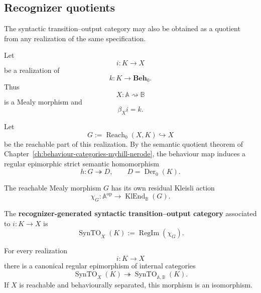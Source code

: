 \subsection{Recognizer quotients}
\label{subsec:syn-to-recognizer-quotients}

The syntactic transition--output category may also be obtained as a quotient
from any realization of the same specification.

Let
\[
    i:K\to X
\]
be a realization of
\[
    k:K\to\mathbf{Beh}_0.
\]
Thus
\[
    X:\mathbb A\rightsquigarrow\mathbb B
\]
is a Mealy morphism and
\[
    \beta_X i=k.
\]

Let
\[
    G:=\operatorname{Reach}_0(X,K)\hookrightarrow X
\]
be the reachable part of this realization. By the semantic quotient theorem of
Chapter~\ref{ch:behaviour-categories-myhill-nerode}, the behaviour map induces
a regular epimorphic strict semantic homomorphism
\[
    h:G\twoheadrightarrow D,
    \qquad
    D=\operatorname{Der}_0(K).
\]

The reachable Mealy morphism \(G\) has its own residual Kleisli action
\[
    \chi_G:
    \mathbb A^{\mathrm{op}}
    \to
    \operatorname{KlEnd}_{\mathbb B}(G).
\]

\begin{definition}
\label{def:syn-to-recognizer-generated-syntactic-category}
    The \textbf{recognizer-generated syntactic transition--output category}
    associated to \(i:K\to X\) is
    \[
        \operatorname{SynTO}_X(K)
        :=
        \operatorname{RegIm}(\chi_G).
    \]
\end{definition}

\begin{theorem}
\label{thm:syn-to-recognizer-quotient}
    For every realization
    \[
        i:K\to X
    \]
    there is a canonical regular epimorphism of internal categories
    \[
        \operatorname{SynTO}_X(K)
        \twoheadrightarrow
        \operatorname{SynTO}_{\mathbb A,\mathbb B}(K).
    \]
    If \(X\) is reachable and behaviourally separated, this morphism is an
    isomorphism.
\end{theorem}


